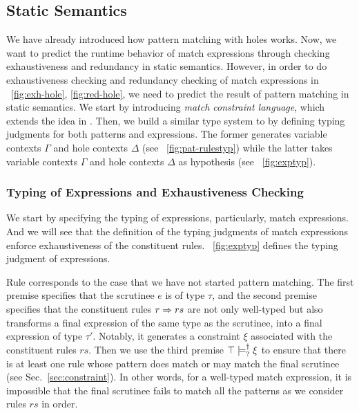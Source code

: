 \documentclass[runningheads,envcountsame,a4paper]{llncs}
\begin{document}
\subsection{Static Semantics}\label{sec:statics}

We have already introduced how pattern matching with holes works. Now, we want
to predict the runtime behavior of match expressions through checking
exhaustiveness and redundancy in static semantics. However, in order to do exhaustiveness checking and redundancy
checking of match expressions in \listfigurename~\ref{fig:exh-hole},
\ref{fig:red-hole}, we need to predict the result of pattern matching in static
semantics. We start by introducing \textit{match constraint language}, which
extends the idea in \cite{Harper2012}. Then, we build a similar type system to
\cite{DBLP:journals/pacmpl/OmarVCH19} by defining typing judgments for both
patterns and expressions. The former generates variable contexts $\Gamma$ and
hole contexts $\Delta$ (see \figurename~\ref{fig:pat-rulestyp}) while the latter 
takes variable contexts $\Gamma$ and hole contexts $\Delta$ as hypothesis (see
\figurename~\ref{fig:exptyp}).

\subsubsection{Typing of Expressions and Exhaustiveness Checking} \label{sec:exptyp}

We start by specifying the typing of expressions, particularly, match
expressions. And we will see that the definition of the typing judgments of
match expressions enforce exhaustiveness of the constituent rules.
\figurename~\ref{fig:exptyp} defines the typing judgment of expressions.



Rule \TMatchZPre corresponds to the case that we have not started pattern
matching. The first premise specifies that the scrutinee $e$ is of type $\tau$,
and the second premise specifies that the constituent rules $r \Rightarrow rs$ are not only
well-typed but also transforms a final expression of the same type as the
scrutinee, into a final expression of type $\tau'$. Notably, it generates a
constraint $\xi$ associated with the constituent rules $rs$. Then we use the
third premise $\top \models_{?}^{\dag} \xi$ to ensure that there is at least
one rule whose pattern does match or may match the final scrutinee (see
Sec.~\ref{sec:constraint}). In other words, for a well-typed match expression,
it is impossible that the final scrutinee fails to match all the patterns as we
consider rules $rs$ in order.
\end{document}
